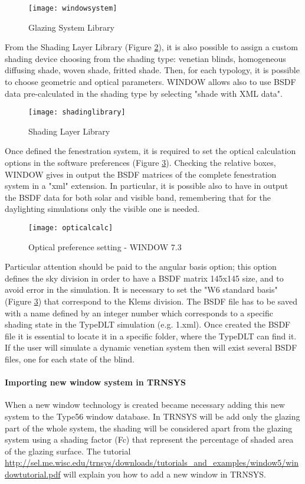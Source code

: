 \begin{figure}[h]
\centering
\texttt{[image: windowsystem]}
\caption{\label{img2:window} Glazing System Library }
\end{figure}

From the Shading Layer Library (Figure \ref{img2:shading}), it is also possible to assign a custom shading device choosing from the shading type: venetian blinds, homogeneous diffusing shade, woven shade, fritted shade. Then, for each typology, it is possible to choose geometric and optical parameters. WINDOW allows also to use BSDF data pre-calculated in the shading type by selecting "shade with XML data". 

\begin{figure}[h]
\centering
\texttt{[image: shadinglibrary]}
\caption{\label{img2:shading} Shading Layer Library }
\end{figure}

Once defined the fenestration system, it is required to set the optical calculation options in the software preferences (Figure \ref{img2:opticalcalc}). Checking the relative boxes, WINDOW gives in output the BSDF matrices of the complete fenestration system in a "xml" extension. In particular, it is possible also to have in output the BSDF data for both solar and visible band, remembering that for the daylighting simulations only the visible one is needed.

\begin{figure}[h]
\centering
\texttt{[image: opticalcalc]}
\caption{\label{img2:opticalcalc} Optical preference setting - WINDOW 7.3}
\end{figure}

Particular attention should be paid to the angular basis option; this option defines the sky division in order to have a BSDF matrix 145x145 size, and to avoid error in the simulation. It is necessary to set the "W6 standard basis" (Figure \ref{img2:opticalcalc}) that correspond to the Klems division.
The BSDF file has to be saved with a name defined by an integer number which corresponds to a specific shading state in the TypeDLT simulation (e.g. 1.xml). Once created the BSDF file it is essential to locate it in a specific folder, where the TypeDLT can find it.
If the user will simulate a dynamic venetian system then will exist several BSDF files, one for each state of the blind.\\
\paragraph{Importing new window system in TRNSYS}
When a new window technology is created became necessary adding this new system to the Type56 window database. In TRNSYS will be add only the glazing part of the whole system, the shading will be considered apart from the glazing system using a shading factor (Fc) that represent the percentage of shaded area of the glazing surface. The tutorial \url{http://sel.me.wisc.edu/trnsys/downloads/tutorials_and_examples/window5/windowtutorial.pdf} will explain you how to add a new window in TRNSYS. 


